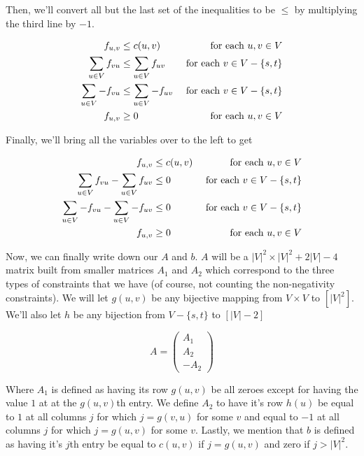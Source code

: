 \documentclass{article}
\begin{document}
Then, we'll convert all but the last set of the inequalities to be $\le$ by multiplying the third line by $-1$.

\begin{align*}
f_{u,v} &\le c(u,v) &\hbox{ for each $u,v\in V$}\\
\sum_{u\in V} f_{vu} &\le \sum_{u\in V} f_{uv}  &\hbox{ for each $v\in V - \{s,t\}$}\\
\sum_{u\in V} -f_{vu} &\le \sum_{u\in V} -f_{uv}  &\hbox{ for each $v\in V - \{s,t\}$}\\
f_{u,v} &\ge 0 &\hbox{ for each $u,v\in V$}\\
\end{align*}

Finally, we'll bring all the variables over to the left to get

\begin{align*}
f_{u,v} &\le c(u,v) &\hbox{ for each $u,v\in V$}\\
\sum_{u\in V} f_{vu} -\sum_{u\in V} f_{uv}&\le 0  &\hbox{ for each $v\in V - \{s,t\}$}\\
\sum_{u\in V} -f_{vu} - \sum_{u\in V} -f_{uv}&\le 0  &\hbox{ for each $v\in V - \{s,t\}$}\\
f_{u,v} &\ge 0 &\hbox{ for each $u,v\in V$}\\
\end{align*}

Now, we can finally write down our $A$ and $b$. $A$ will be a $|V|^2 \times |V|^2 + 2|V| -4$ matrix built from smaller matrices $A_1$ and $A_2$ which correspond to the three types of constraints that we have (of course, not counting the non-negativity constraints). We will let $g(u,v)$ be any bijective mapping from $V\times V$ to $\left[|V|^2\right]$. We'll also let $h$ be any bijection from $V- \{s,t\}$ to $[|V|-2]$

\[
A = \left(\begin{array}{c}
A_1\\
A_2\\
-A_2
\end{array}\right)
\]

Where $A_1$ is defined as having its row $g(u,v)$ be all zeroes except for having the value $1$ at at the $g(u,v)$th entry. We define $A_2$ to have it's row $h(u)$ be equal to $1$ at all columns $j$ for which $j=g(v,u)$ for some $v$ and equal to $-1$ at all columns $j$ for which $j= g(u,v)$ for some $v$. Lastly, we mention that $b$ is defined as having it's $j$th entry be equal to $c(u,v)$ if $j =g(u,v)$ and zero if $j > |V|^2$.
\end{document}
